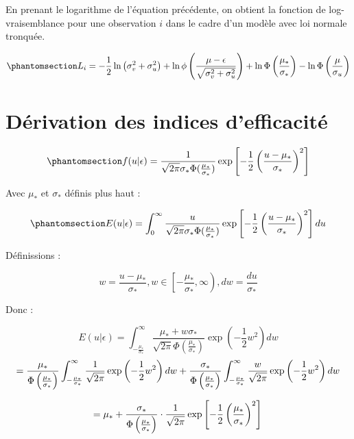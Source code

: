 \documentclass[
  12pt,
]{report}
\begin{document}
En prenant le logarithme de l'équation précédente, on obtient la
fonction de log-vraisemblance pour une observation \(i\) dans le cadre
d'un modèle avec loi normale tronquée.

\begin{equation}\phantomsection\label{eq-log-likelihood}{
L_i = - \frac{1}{2}\ln\left(\sigma^2_v+\sigma^2_u\right) + \ln \phi \left(\frac{\mu - \epsilon}{\sqrt{\sigma^2_v+\sigma^2_u}}\right) + \ln \Phi \left(\frac{\mu_*}{\sigma_*}\right) - \ln \Phi\left(\frac{\mu}{\sigma_u}\right)
}\end{equation}

\section{Dérivation des indices
d'efficacité}\label{duxe9rivation-des-indices-defficacituxe9}

\begin{equation}\phantomsection\label{eq-f-u-epsilon}{
f(u|\epsilon) = \frac{1}{\sqrt{2 \pi}\sigma_* \Phi(\frac{\mu_*}{\sigma_*})} \exp\left[- \frac{1}{2}\left(\frac{u - \mu_*}{\sigma_*}\right)^2\right]
}\end{equation}

Avec \(\mu_*\) et \(\sigma_*\) définis plus haut :

\begin{equation}\phantomsection\label{eq-expected-u-epsilon}{
E(u | \epsilon) =  \int_{0}^{\infty} \frac{u}{\sqrt{2 \pi}\sigma_* \Phi(\frac{\mu_*}{\sigma_*})} \exp\left[- \frac{1}{2}\left(\frac{u - \mu_*}{\sigma_*}\right)^2\right] du
}\end{equation}

Définissions :

\[
w = \frac{u - \mu_*}{\sigma_*},   w \in \left[ -\frac{\mu_*}{\sigma_*}, \infty \right), dw = \frac{du}{\sigma_*}
\]

Donc :

\[
E(u | \epsilon) =  \int_{- \frac{\mu_*}{\sigma_*}}^{\infty} \frac{\mu_* + w\sigma_*}{\sqrt{2 \pi} \Phi \left(\frac{\mu_*}{\sigma_*}\right)} \exp \left(- \frac{1}{2} w^2 \right) dw
\] \[
= \frac{\mu_*}{\Phi \left(\frac{\mu_*}{\sigma_*}\right)} \int_{- \frac{\mu_*}{\sigma_*}}^{\infty} \frac{1}{\sqrt{2 \pi}} \exp \left(- \frac{1}{2} w^2 \right)dw + \frac{\sigma_*}{\Phi \left(\frac{\mu_*}{\sigma_*} \right)} \int_{- \frac{\mu_*}{\sigma_*}}^{\infty} \frac{w}{\sqrt{2 \pi}} \exp \left(- \frac{1}{2} w^2 \right)dw\\
\]

\[
= \mu_* + \frac{\sigma_*}{\Phi \left(\frac{\mu_*}{\sigma_*} \right)} \cdot \frac{1}{\sqrt{2 \pi}} \exp \left[- \frac{1}{2} \left(\frac{\mu_*}{\sigma_*} \right)^2 \right]\\
\]
\end{document}
